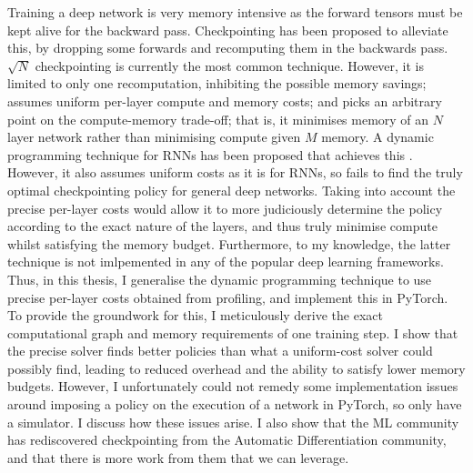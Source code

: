 \small
Training a deep network is very memory intensive as the forward tensors must be kept alive for the backward pass.
Checkpointing has been proposed to alleviate this, by dropping some forwards and recomputing them in the backwards pass.
\(\sqrt{N}\) checkpointing \cite{Chen2016} is currently the most common technique.
However, it is limited to only one recomputation, inhibiting the possible memory savings; assumes uniform per-layer compute and memory costs;
and picks an arbitrary point on the compute-memory trade-off;
that is, it minimises memory of an \(N\) layer network rather than minimising compute given \(M\) memory.
A dynamic programming technique for RNNs has been proposed that achieves this \cite{Gruslys2016}.
However, it also assumes uniform costs as it is for RNNs, so fails to find the truly optimal checkpointing policy for general deep networks.
Taking into account the precise per-layer costs would allow it to more judiciously determine the policy according to the exact nature of the layers, and thus truly minimise compute whilst satisfying the memory budget.
Furthermore, to my knowledge, the latter technique is not imlpemented in any of the popular deep learning frameworks.
Thus, in this thesis, I generalise the dynamic programming technique to use precise per-layer costs obtained from profiling, and implement this in PyTorch.
To provide the groundwork for this, I meticulously derive the exact computational graph and memory requirements of one training step.
I show that the precise solver finds better policies than what a uniform-cost solver could possibly find, leading to reduced overhead and the ability to satisfy lower memory budgets.
However, I unfortunately could not remedy some implementation issues around imposing a policy on the execution of a network in PyTorch, so only have a simulator. I discuss how these issues arise.
I also show that the ML community has rediscovered checkpointing from the Automatic Differentiation community, and that there is more work from them that we can leverage.


